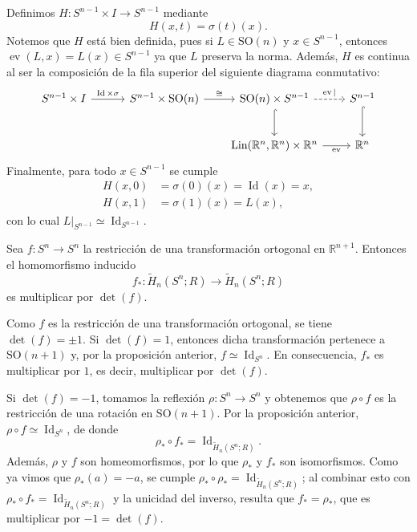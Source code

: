 \begin{dem}
Definimos $H \colon S^{n-1} \times I \to S^{n-1}$ mediante
\[
H(x, t) = \sigma(t)(x).
\]
Notemos que $H$ está bien definida, pues si $L \in \mathrm{SO}(n)$ y $x \in S^{n-1}$, entonces $\operatorname{ev}(L, x) = L(x) \in S^{n-1}$ ya que $L$ preserva la norma. Además, $H$ es continua al ser la composición de la fila superior del siguiente diagrama conmutativo:
\[
\begin{tikzcd}[column sep=2.0em, row sep=2.4em]
S^{n-1} \times I \arrow[r, "\operatorname{Id} \times \sigma"] &[1.0em]
S^{n-1} \times \mathrm{SO}(n) \arrow[r, "\cong"] &
\mathrm{SO}(n) \times S^{n-1} \arrow[r, dashed, "\operatorname{ev}|"] \arrow[d, hook] &
S^{n-1} \arrow[d, hook] \\
& & \operatorname{Lin}(\mathbb{R}^n, \mathbb{R}^n) \times \mathbb{R}^n \arrow[r, "\operatorname{ev}"'] & \mathbb{R}^n
\end{tikzcd}
\]
Finalmente, para todo $x \in S^{n-1}$ se cumple
\begin{align*}
H(x, 0) &= \sigma(0)(x) = \operatorname{Id}(x) = x, \\
H(x, 1) &= \sigma(1)(x) = L(x),
\end{align*}
con lo cual $L|_{S^{n-1}} \simeq \operatorname{Id}_{S^{n-1}}$.
\end{dem}

\begin{prop}
Sea $f \colon S^n \to S^n$ la restricción de una transformación ortogonal en $\mathbb{R}^{n+1}$. Entonces el homomorfismo inducido
\[
f_* \colon \widetilde{H}_n(S^n; R) \longrightarrow \widetilde{H}_n(S^n; R)
\]
es multiplicar por $\det(f)$.
\end{prop}

\begin{dem}
Como $f$ es la restricción de una transformación ortogonal, se tiene $\det(f) = \pm 1$. Si $\det(f) = 1$, entonces dicha transformación pertenece a $\mathrm{SO}(n+1)$ y, por la proposición anterior, $f \simeq \operatorname{Id}_{S^n}$. En consecuencia, $f_*$ es multiplicar por $1$, es decir, multiplicar por $\det(f)$.

Si $\det(f) = -1$, tomamos la reflexión $\rho \colon S^n \to S^n$ y obtenemos que $\rho \circ f$ es la restricción de una rotación en $\mathrm{SO}(n+1)$. Por la proposición anterior, $\rho \circ f \simeq \operatorname{Id}_{S^n}$, de donde
\[
\rho_* \circ f_* = \operatorname{Id}_{\widetilde{H}_n(S^n; R)}.
\]
Además, $\rho$ y $f$ son homeomorfismos, por lo que $\rho_*$ y $f_*$ son isomorfismos. Como ya vimos que $\rho_*(a) = -a$, se cumple $\rho_* \circ \rho_* = \operatorname{Id}_{\widetilde{H}_n(S^n; R)}$; al combinar esto con $\rho_* \circ f_* = \operatorname{Id}_{\widetilde{H}_n(S^n; R)}$ y la unicidad del inverso, resulta que $f_* = \rho_*$, que es multiplicar por $-1 = \det(f)$.
\end{dem}

